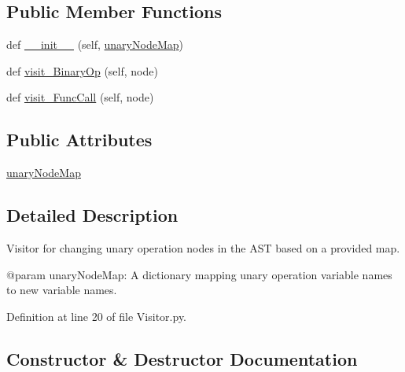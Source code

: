 \subsection*{Public Member Functions}
\begin{DoxyCompactItemize}
\item 
def \hyperlink{classPostProcessor_1_1Visitor_1_1UnaryOpNodeChanger_a5c7851b11b60cfafc8885d45b07ead44}{\+\_\+\+\_\+init\+\_\+\+\_\+} (self, \hyperlink{classPostProcessor_1_1Visitor_1_1UnaryOpNodeChanger_a45d99513007ccd4190a027d805a8d0db}{unary\+Node\+Map})
\item 
def \hyperlink{classPostProcessor_1_1Visitor_1_1UnaryOpNodeChanger_a6329fbf13e2d22de5384fbca843113b8}{visit\+\_\+\+Binary\+Op} (self, node)
\item 
def \hyperlink{classPostProcessor_1_1Visitor_1_1UnaryOpNodeChanger_a48e7baeee3968db14598ff72b6be63bd}{visit\+\_\+\+Func\+Call} (self, node)
\end{DoxyCompactItemize}
\subsection*{Public Attributes}
\begin{DoxyCompactItemize}
\item 
\hyperlink{classPostProcessor_1_1Visitor_1_1UnaryOpNodeChanger_a45d99513007ccd4190a027d805a8d0db}{unary\+Node\+Map}
\end{DoxyCompactItemize}


\subsection{Detailed Description}
\begin{DoxyVerb}Visitor for changing unary operation nodes in the AST based on a provided map.

@param unaryNodeMap: A dictionary mapping unary operation variable names to new variable names.
\end{DoxyVerb}
 

Definition at line 20 of file Visitor.\+py.



\subsection{Constructor \& Destructor Documentation}
\mbox{\label{classPostProcessor_1_1Visitor_1_1UnaryOpNodeChanger_a5c7851b11b60cfafc8885d45b07ead44}} 
